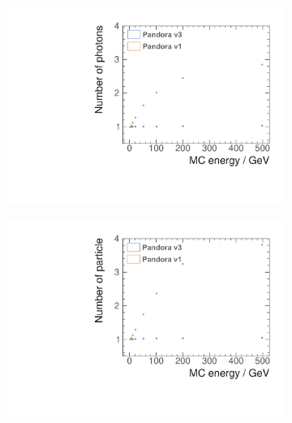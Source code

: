 
\begin{figure}[tbph]
\centering
    \begin{subfigure}[b]{0.45\textwidth}
        \includegraphics[width=\textwidth]{photon/SingleN_pedit.pdf}
        \caption{}
        \label{fig:photonSingleN_p}
    \end{subfigure}
    \begin{subfigure}[b]{0.45\textwidth}
        \includegraphics[width=\textwidth]{photon/SingleN_alledit.pdf}

\end{subfigure}
\end{figure}
